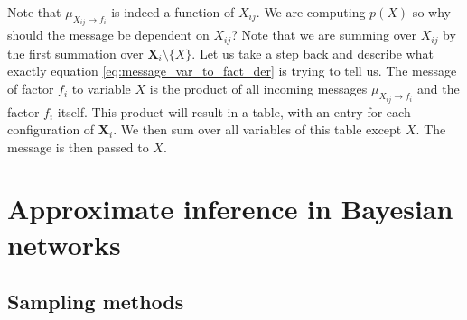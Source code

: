 \noindent
Note that $\mu_{X_{ij} \rightarrow f_i}$ is indeed a function of
$X_{ij}$. We are computing $p(X)$ so why should the message be 
dependent on $X_{ij}$? Note that we are summing over $X_{ij}$ by 
the first summation over $\textbf{X}_i \setminus \{X\}$. Let us
take a step back and describe what exactly equation 
\ref{eq:message_var_to_fact_der} is trying to tell us. The message
of factor $f_i$ to variable $X$ is the product of all incoming
messages $\mu_{X_{ij} \rightarrow f_i}$ and the factor $f_i$ itself.
This product will result in a table, with an entry for each configuration
of $\textbf{X}_i$. We then sum over all variables of this table
except $X$. The message is then passed to $X$.


\section{Approximate inference in Bayesian networks}
\subsection{Sampling methods}
